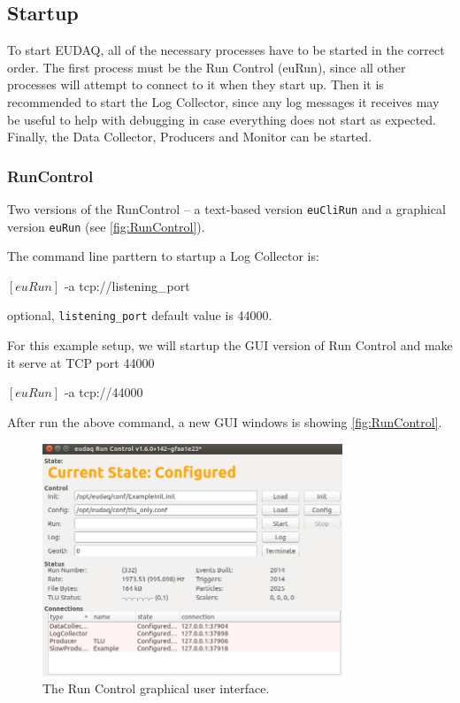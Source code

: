 \subsection{Startup}
To start EUDAQ, all of the necessary processes have to be started in the correct order.
The first process must be the Run Control (euRun),
since all other processes will attempt to connect to it when they start up.
Then it is recommended to start the Log Collector,
since any log messages it receives may be useful
to help with debugging in case everything does not start as expected.
Finally, the Data Collector, Producers and Monitor can be started.

\subsubsection{RunControl}
\label{sec:runcontrol}
Two versions of the RunControl -- a text-based version \texttt{euCliRun} and a graphical version \texttt{euRun} (see \autoref{fig:RunControl}).

The command line parttern to startup a Log Collector is:
\begin{listing}[mybash]
$[euRun]$ -a tcp://{listening_port}
\end{listing}

\begin{description}
optional, \texttt{listening\_port} default value is 44000.
\end{description}

For this example setup, we will startup the GUI version of Run Control and make it serve at TCP port 44000\\
\begin{listing}[mybash]
$[euRun]$ -a tcp://44000
\end{listing}

After run the above command, a new GUI windows is showing \autoref{fig:RunControl}.
\begin{figure}[htb]
  \begin{center}
    \includegraphics[width=0.8\textwidth]{src/images/RunControl}
    \caption{The Run Control graphical user interface.}
    \label{fig:RunControl}
  \end{center}
\end{figure}

